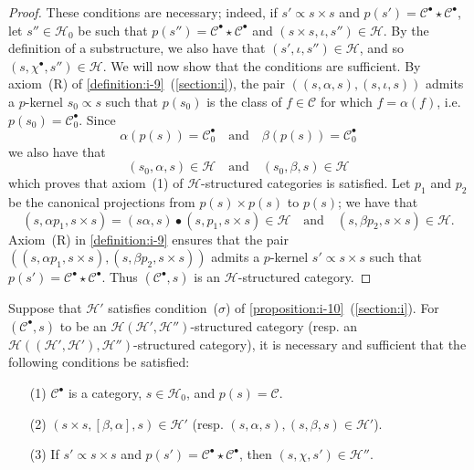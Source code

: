 \documentclass[a4paper,fleqn]{article}
\theoremstyle{plain}
\newenvironment{proposition}[1]
  {\renewcommand\theinnerproposition{#1}\innerproposition}
  {\endinnerproposition}
\theoremstyle{definition}
\newcommand{\oldpage}[1]{{\marginpar{\footnotesize$\bigg\vert$\,\,\,\,\textit{p.~#1}}}}
\newcommand{\textand}{\quad\text{and}\quad}
\newcommand{\CC}{\mathcal{C}}
\newcommand{\HH}{\mathcal{H}}
\newcommand{\subs}{\mathrel{\propto}}
\begin{document}
\begin{proof}
  These conditions are necessary;
  indeed, if $s'\subs s\times s$ and $p(s')=\CC^\bullet\star\CC^\bullet$, let $s''\in\HH_0$ be such that $p(s'')=\CC^\bullet\star\CC^\bullet$ and $(s\times s,\iota,s'')\in\HH$.
  By the definition of a substructure, we also have that $(s',\iota,s'')\in\HH$, and so $(s,\chi^\bullet,s'')\in\HH$.
  We will now show that the conditions are sufficient.
  \oldpage{411}
  By axiom~(R) of \cref{definition:i-9}~(\cref{section:i}), the pair $((s,\alpha,s),(s,\iota,s))$ admits a $p$-kernel $s_0\subs s$ such that $p(s_0)$ is the class of $f\in\CC$ for which $f=\alpha(f)$, i.e. $p(s_0)=\CC_0^\bullet$.
  Since
  \[
    \alpha(p(s))=\CC_0^\bullet
    \textand
    \beta(p(s))=\CC_0^\bullet
  \]
  we also have that
  \[
    (s_0,\alpha,s)\in\HH
    \textand
    (s_0,\beta,s)\in\HH
  \]
  which proves that axiom~(1) of $\HH$-structured categories is satisfied.
  Let $p_1$ and $p_2$ be the canonical projections from $p(s)\times p(s)$ to $p(s)$;
  we have that
  \[
    (s,\alpha p_1,s\times s)
    = (s\alpha,s)\bullet(s,p_1,s\times s)
    \in\HH
    \textand
    (s,\beta p_2,s\times s)
    \in\HH.
  \]
  Axiom~(R) in \cref{definition:i-9} ensures that the pair $((s,\alpha p_1,s\times s),(s,\beta p_2,s\times s))$ admits a $p$-kernel $s'\subs s\times s$ such that $p(s')=\CC^\bullet\star\CC^\bullet$.
  Thus $(\CC^\bullet,s)$ is an $\HH$-structured category.
\end{proof}

\begin{proposition}{28}
\label{proposition:ii-28}
  Suppose that $\HH'$ satisfies condition~($\sigma$) of \cref{proposition:i-10}~(\cref{section:i}).
  For $(\CC^\bullet,s)$ to be an $\HH(\HH',\HH'')$-structured category (resp. an $\HH((\HH',\HH'),\HH'')$-structured category), it is necessary and sufficient that the following conditions be satisfied:
  \begin{enumerate}
    \item[\normalfont(1)]
      $\CC^\bullet$ is a category, $s\in\HH_0$, and $p(s)=\CC$.
    \item[\normalfont(2)]
      $(s\times s,[\beta,\alpha],s)\in\HH'$ (resp. $(s,\alpha,s),(s,\beta,s)\in\HH'$).
    \item[\normalfont(3)]
      If $s'\subs s\times s$ and $p(s')=\CC^\bullet\star\CC^\bullet$, then $(s,\chi,s')\in\HH''$.
  \end{enumerate}
\end{proposition}
\end{document}
